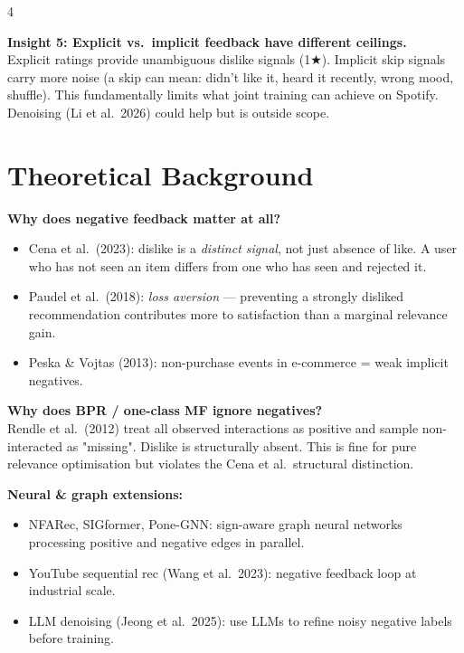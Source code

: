 \documentclass[9pt,a4paper,landscape]{article}
\begin{document}
\begin{multicols}{4}
\begin{mdframed}[backgroundcolor=base!10,linewidth=0.4pt]
\textbf{Insight 5: Explicit vs.\ implicit feedback have different ceilings.}\\
Explicit ratings provide unambiguous dislike signals (1★). Implicit skip signals carry more noise (a skip can mean: didn't like it, heard it recently, wrong mood, shuffle). This fundamentally limits what joint training can achieve on Spotify. Denoising (Li et al.\ 2026) could help but is outside scope.
\end{mdframed}

\section{Theoretical Background}

\textbf{Why does negative feedback matter at all?}
\begin{itemize}
  \item Cena et al.\ (2023): dislike is a \emph{distinct signal}, not just absence of like. A user who has not seen an item differs from one who has seen and rejected it.
  \item Paudel et al.\ (2018): \emph{loss aversion} — preventing a strongly disliked recommendation contributes more to satisfaction than a marginal relevance gain.
  \item Peska \& Vojtas (2013): non-purchase events in e-commerce = weak implicit negatives.
\end{itemize}

\textbf{Why does BPR / one-class MF ignore negatives?}\\
Rendle et al.\ (2012) treat all observed interactions as positive and sample non-interacted as "missing". Dislike is structurally absent. This is fine for pure relevance optimisation but violates the Cena et al.\ structural distinction.

\textbf{Neural \& graph extensions:}
\begin{itemize}
  \item NFARec, SIGformer, Pone-GNN: sign-aware graph neural networks processing positive and negative edges in parallel.
  \item YouTube sequential rec (Wang et al.\ 2023): negative feedback loop at industrial scale.
  \item LLM denoising (Jeong et al.\ 2025): use LLMs to refine noisy negative labels before training.
\end{itemize}


\end{multicols}
\end{document}
